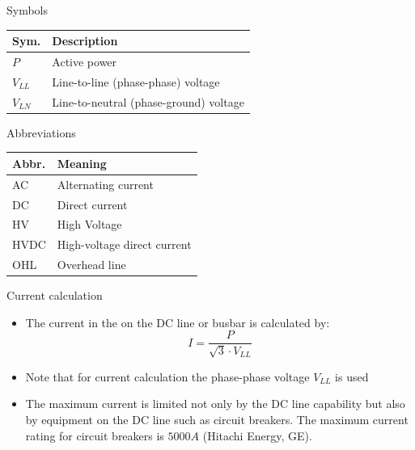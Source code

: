 

\begin{frame}{Symbols}
  \renewcommand{\arraystretch}{1.3}
  \begin{tabular}{@{}p{1.3cm}p{9.0cm}@{}}
    \textbf{Sym.} & \textbf{Description} \\
    \hline
    $P$        & Active power \\
    $V_{LL}$   & Line-to-line (phase-phase) voltage \\
    $V_{LN}$   & Line-to-neutral (phase-ground) voltage \\
  \end{tabular}
\end{frame}

\begin{frame}{Abbreviations}
  \renewcommand{\arraystretch}{1.3}
  \begin{tabular}{@{}p{1.5cm}p{9.0cm}@{}}
    \textbf{Abbr.} & \textbf{Meaning} \\
    \hline
    AC   & Alternating current \\
    DC   & Direct current \\
    HV   & High Voltage \\
    HVDC & High-voltage direct current \\
    OHL  & Overhead line \\
  \end{tabular}
\end{frame}


\begin{frame}{Current calculation}
  \begin{itemize}
    \setlength{\itemsep}{0.5em}
    \item The current in the on the DC line or busbar is calculated by:
    \[ I = \frac{P}{\sqrt{3}\cdot V_{LL}} \]
    \item Note that for current calculation the phase-phase voltage $V_{LL}$ is used
    \item The maximum current is limited not only by the DC line capability but also by equipment on the DC line such as circuit breakers. 
    The maximum current rating for circuit breakers is $5000A$ (Hitachi Energy, GE).

  \end{itemize}
\end{frame}
